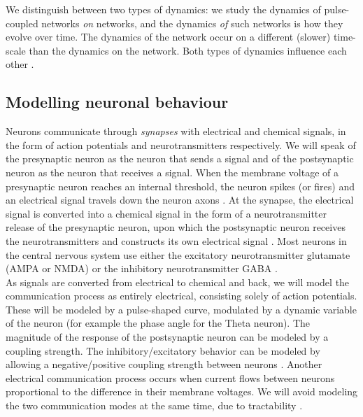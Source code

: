 We distinguish between two types of dynamics: we study the dynamics of pulse-coupled networks \textsl{on} networks, and the dynamics \textsl{of} such networks is how they evolve over time. The dynamics of the network occur on a different (slower) time-scale than the dynamics on the network. Both types of dynamics influence each other \cite{AdaptiveNetworks2009}. 

\subsection{Modelling neuronal behaviour}
Neurons communicate through \textsl{synapses} with electrical and chemical signals, in the form of action potentials and neurotransmitters respectively. We will speak of the presynaptic neuron as the neuron that sends a signal and of the postsynaptic neuron as the neuron that receives a signal. When the membrane voltage of a presynaptic neuron reaches an internal threshold, the neuron spikes (or fires) and an electrical signal travels down the neuron axons \cite{IntroductionModelingDynamics}. At the synapse, the electrical signal is converted into a chemical signal in the form of a neurotransmitter release of the presynaptic neuron, upon which the postsynaptic neuron receives the neurotransmitters and constructs its own electrical signal \cite{ActionPotentialsAndSynapses}. Most neurons in the central nervous system use either the excitatory neurotransmitter glutamate (AMPA or NMDA) or the inhibitory neurotransmitter GABA \cite{MathFoundationNeuroscience, Zhang2012}. \\

As signals are converted from electrical to chemical and back, we will model the communication process as entirely electrical, consisting solely of action potentials. These will be modeled by a pulse-shaped curve, modulated by a dynamic variable of the neuron (for example the phase angle for the Theta neuron). The magnitude of the response of the postsynaptic neuron can be modeled by a coupling strength. The inhibitory/excitatory behavior can be modeled by allowing a negative/positive coupling strength between neurons \cite{Luke2013, Martens2020, Montbrio2015, OttAntonsen2017}.
Another electrical communication process occurs when current flows between neurons proportional to the difference in their membrane voltages. We will avoid modeling the two communication modes at the same time, due to tractability \cite{Martens2020}. 

